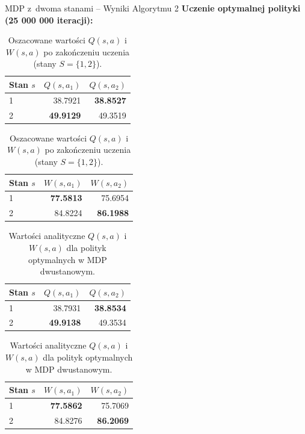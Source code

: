 \documentclass[aspectratio=169]{beamer}
\begin{document}
\begin{frame}{MDP z~dwoma stanami -- Wyniki Algorytmu 2}
\textbf{Uczenie optymalnej polityki (25 000 000 iteracji):}

\begin{table}[h!]
\centering
\caption{Oszacowane wartości $Q(s,a)$ i $W(s,a)$ po zakończeniu uczenia (stany $S=\{1,2\}$).}
\label{tab:two_state_learned_qw}
\begin{minipage}[t]{0.48\textwidth}
\centering
\begin{tabular}{lrr}
	\toprule
	\textbf{Stan $s$} & $Q(s,a_1)$ & $Q(s,a_2)$ \\
\midrule
1 & 38.7921 & \textbf{38.8527} \\
2 & \textbf{49.9129} & 49.3519 \\
\bottomrule
\end{tabular}
\end{minipage}
\hfill
\begin{minipage}[t]{0.48\textwidth}
\centering
\begin{tabular}{lrr}
	\toprule
	\textbf{Stan $s$} & $W(s,a_1)$ & $W(s,a_2)$ \\
\midrule
1 & \textbf{77.5813} & 75.6954 \\
2 & 84.8224 & \textbf{86.1988} \\
\bottomrule
\end{tabular}
\end{minipage}
\end{table}

\vspace{0.3em}
\begin{table}[h!]
\centering
\caption{Wartości analityczne $Q(s,a)$ i $W(s,a)$ dla polityk optymalnych w MDP dwustanowym.}
\label{tab:two_state_analytic_qw}
\begin{minipage}[t]{0.48\textwidth}
\centering
\begin{tabular}{lrr}
    \toprule
    \textbf{Stan $s$} & $Q(s,a_1)$ & $Q(s,a_2)$ \\
\midrule
1 & 38.7931 & \textbf{38.8534} \\
2 & \textbf{49.9138} & 49.3534 \\
\bottomrule
\end{tabular}
\end{minipage}
\hfill
\begin{minipage}[t]{0.48\textwidth}
\centering
\begin{tabular}{lrr}
    \toprule
    \textbf{Stan $s$} & $W(s,a_1)$ & $W(s,a_2)$ \\
\midrule
1 & \textbf{77.5862} & 75.7069 \\
2 & 84.8276 & \textbf{86.2069} \\
\bottomrule
\end{tabular}
\end{minipage}
\end{table}


\end{frame}
\end{document}
